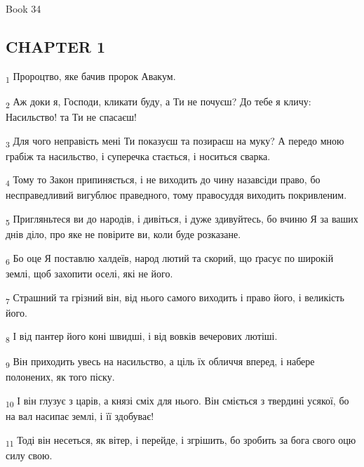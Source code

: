 Book 34
\subsection{CHAPTER 1}
\begin{tcolorbox}
\textsubscript{1} Пророцтво, яке бачив пророк Авакум.
\end{tcolorbox}
\begin{tcolorbox}
\textsubscript{2} Аж доки я, Господи, кликати буду, а Ти не почуєш? До тебе я кличу: Насильство! та Ти не спасаєш!
\end{tcolorbox}
\begin{tcolorbox}
\textsubscript{3} Для чого неправість мені Ти показуєш та позираєш на муку? А передо мною грабіж та насильство, і суперечка стається, і носиться сварка.
\end{tcolorbox}
\begin{tcolorbox}
\textsubscript{4} Тому то Закон припиняється, і не виходить до чину назавсіди право, бо несправедливий вигублює праведного, тому правосуддя виходить покривленим.
\end{tcolorbox}
\begin{tcolorbox}
\textsubscript{5} Пригляньтеся ви до народів, і дивіться, і дуже здивуйтесь, бо вчиню Я за ваших днів діло, про яке не повірите ви, коли буде розказане.
\end{tcolorbox}
\begin{tcolorbox}
\textsubscript{6} Бо оце Я поставлю халдеїв, народ лютий та скорий, що ґрасує по широкій землі, щоб захопити оселі, які не його.
\end{tcolorbox}
\begin{tcolorbox}
\textsubscript{7} Страшний та грізний він, від нього самого виходить і право його, і великість його.
\end{tcolorbox}
\begin{tcolorbox}
\textsubscript{8} І від пантер його коні швидші, і від вовків вечерових лютіші.
\end{tcolorbox}
\begin{tcolorbox}
\textsubscript{9} Він приходить увесь на насильство, а ціль їх обличчя вперед, і набере полонених, як того піску.
\end{tcolorbox}
\begin{tcolorbox}
\textsubscript{10} І він глузує з царів, а князі сміх для нього. Він сміється з твердині усякої, бо на вал насипає землі, і її здобуває!
\end{tcolorbox}
\begin{tcolorbox}
\textsubscript{11} Тоді він несеться, як вітер, і перейде, і згрішить, бо зробить за бога свого оцю силу свою.
\end{tcolorbox}
